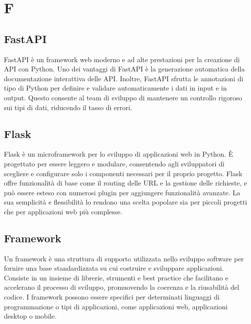 \section{F}
\vspace{2em}
\subsection*{FastAPI}
FastAPI è un framework web moderno e ad alte prestazioni per la creazione di API con Python. Uno dei vantaggi di FastAPI è la generazione automatica della documentazione interattiva delle API. Inoltre, FastAPI sfrutta le annotazioni di tipo di Python per definire e validare automaticamente i dati in input e in output. Questo consente al team di sviluppo di mantenere un controllo rigoroso sui tipi di dati, riducendo il tasso di errori.

\vspace{2em}
\subsection*{Flask}
Flask è un microframework per lo sviluppo di applicazioni web in Python. È progettato per essere leggero e modulare, consentendo agli sviluppatori di scegliere e configurare solo i componenti necessari per il proprio progetto. Flask offre funzionalità di base come il routing delle URL e la gestione delle richieste, e può essere esteso con numerosi plugin per aggiungere funzionalità avanzate. La sua semplicità e flessibilità lo rendono una scelta popolare sia per piccoli progetti che per applicazioni web più complesse.


\vspace{2em}
\subsection*{Framework}
Un framework è una struttura di supporto utilizzata nello sviluppo software per fornire una base standardizzata su cui costruire e sviluppare applicazioni. Consiste in un insieme di librerie, strumenti e best practice che facilitano e accelerano il processo di sviluppo, promuovendo la coerenza e la riusabilità del codice. I framework possono essere specifici per determinati linguaggi di programmazione o tipi di applicazioni, come applicazioni web, applicazioni desktop o mobile.
